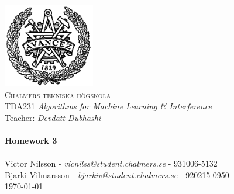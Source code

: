 
\begin{titlepage}
\begin{center}


~\\[1.0cm]
 \includegraphics[width=0.3\textwidth]{Figures/chalmers.png}~\\[1.0cm]

\textsc{\LARGE Chalmers tekniska högskola}\\[0.3cm]
TDA231 \textit{Algorithms for Machine Learning \& Interference}\\
Teacher: \textit{Devdatt Dubhashi} \\

\HRule \\[0.3cm]
{ \huge \bfseries Homework 3 \\[0.3cm] }
\HRule \\[0.3cm]

Victor Nilsson  -  \textit{vicnilss@student.chalmers.se} - 931006-5132\\ [0.3cm]
Bjarki Vilmarsson  -  \textit{bjarkiv@student.chalmers.se} - 920215-0950\\ [0.3cm]


\vfill
{\large \today}

\end{center}
\end{titlepage}

\newpage